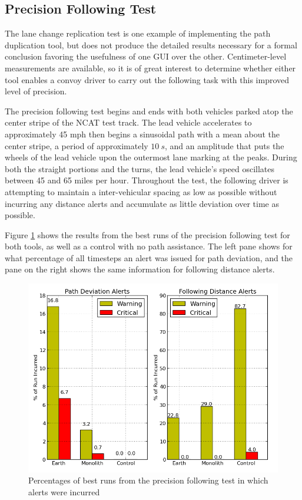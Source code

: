 \documentclass[twocolumn,10pt]{article}
\begin{document}
  \subsection*{Precision Following Test}

    The lane change replication test is one example of implementing the path duplication tool, but does not produce the detailed results necessary for a formal conclusion favoring the usefulness of one GUI over the other.  Centimeter-level measurements are available, so it is of great interest to determine whether either tool enables a convoy driver to carry out the following task with this improved level of precision.
    
    The precision following test begins and ends with both vehicles parked atop the center stripe of the NCAT test track.  The lead vehicle accelerates to approximately 45 mph then begins a sinusoidal path with a mean about the center stripe, a period of approximately $10~s$, and an amplitude that puts the wheels of the lead vehicle upon the outermost lane marking at the peaks.  During both the straight portions and the turns, the lead vehicle's speed oscillates between 45 and 65 miles per hour.  Throughout the test, the following driver is attempting to maintain a inter-vehicular spacing as low as possible without incurring any distance alerts and accumulate as little deviation over time as possible.

    Figure \ref{fig:precision_following_alert_percents} shows the results from the best runs of the precision following test for both tools, as well as a control with no path assistance. The left pane shows for what percentage of all timesteps an alert was issued for path deviation, and the pane on the right shows the same information for following distance alerts.

    \begin{figure}[ht] \centering
      \includegraphics[width=\columnwidth]{../graphics/precision_following_alert_percents.png}
      \caption{Percentages of best runs from the precision following test in which alerts were incurred}
      \label{fig:precision_following_alert_percents}
    \end{figure}
\end{document}
